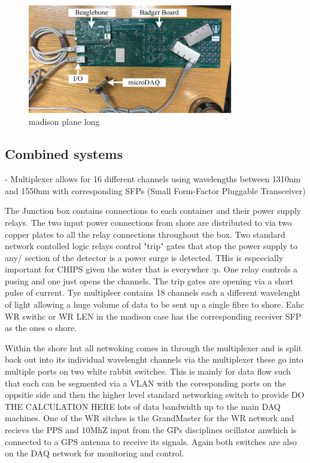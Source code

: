 \begin{figure} %
    \includegraphics[width=0.8\textwidth]{diagrams/5-daq/madison_plane.pdf}
    \caption[madison plane short]
    {madison plane long}

    \label{fig:madison_plane}
\end{figure}

\subsection{Combined systems} %
\label{sec:daq_hard_combined} %

- Multiplexer allows for 16 different channels using wavelengths between 1310nm and 1550nm with
corresponding SFPs (Small Form-Factor Pluggable Transceiver)

The Junction box contains connections to each container and their power supply relays. The two
input power connections from shore are distributed to via two copper plates to all the relay
connections throughout the box. Two standard network contolled logic relays control "trip" gates
that stop the power supply to any/ section of the detector is a power surge is detected. THis is
espcecially important for CHIPS given the water that is everywher :p. One relay controls a pusing
and one just opens the channels. The trip gates are opening via a short pulse of current. Tye
multipleer contains 18 channels each a different wavelenght of light allowing a huge volume of
data to be sent up a single fibre to shore. Eahc WR swithc or WR LEN in the madison case has the
corresponding receiver SFP as the ones o shore.

Within the shore hut all netwoking comes in through the multiplexer and is split back out into its
individual wavelenght channels via the multiplexer these go into multiple ports on two white
rabbit switches. This is mainly for data flow such that each can be segmented via a VLAN with the
coresponding ports on the oppsitie side and then the higher level standard networking switch to
provide DO THE CALCULATION HERE lots of data bandwidth up to the main DAQ machines. One of the WR
sitches is the GrandMaster for the WR network and recievs the PPS and 10MhZ input from the GPs
disciplines ocillator anwhich is connected to a GPS antenna to receive its signals. Again both
switches are also on the DAQ network for monitoring and control.


